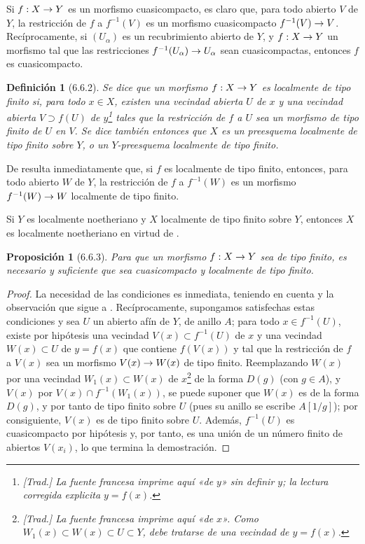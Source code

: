 \documentclass[oneside]{amsart}
\theoremstyle{ega-env-style}
\theoremstyle{ega-thm-env-style}
\newtheorem*{proposition}{Proposición}
\theoremstyle{ega-defn-env-style}
\newtheorem*{definition}{Definición}
\renewcommand{\to}{\mathchoice{\longrightarrow}{\rightarrow}{\rightarrow}{\rightarrow}}
\newcommand{\oldpage}[2][]{{\marginnote{\normalfont{\textbf{#1}~|~#2}}}\ignorespaces}
\let\EGAOriginalLabel\label
\renewcommand{\label}[1]{\phantomsection\EGAOriginalLabel{#1}}
\begin{document}
Si $f:X\to Y$ es un morfismo cuasicompacto, es claro que, para todo abierto $V$ de $Y$, la restricción de $f$ a $f^{-1}(V)$ es un morfismo cuasicompacto $f^{-1}(V)\to V$.
Recíprocamente, si $(U_\alpha)$ es un recubrimiento abierto de $Y$, y $f:X\to Y$ un morfismo tal que las restricciones $f^{-1}(U_\alpha)\to U_\alpha$ sean cuasicompactas, entonces $f$ es cuasicompacto.

\begin{definition}[6.6.2]
\label{I.6.6.2}
{\itshape Se dice que un morfismo $f:X\to Y$ es localmente de tipo finito si, para todo $x\in X$, existen una vecindad abierta $U$ de $x$ y una vecindad abierta $V\supset f(U)$ de $y$\footnote{\emph{[Trad.] La fuente francesa imprime aquí «de $y$» sin definir $y$; la lectura corregida explicita $y=f(x)$.}} tales que la
\oldpage[I]{153}
restricción de $f$ a $U$ sea un morfismo de tipo finito de $U$ en $V$.
Se dice también entonces que $X$ es un preesquema localmente de tipo finito sobre $Y$, o un $Y$-preesquema localmente de tipo finito.}
\end{definition}

De  resulta inmediatamente que, si $f$ es localmente de tipo finito, entonces, para todo abierto $W$ de $Y$, la restricción de $f$ a $f^{-1}(W)$ es un morfismo $f^{-1}(W)\to W$ localmente de tipo finito.

Si $Y$ es localmente noetheriano y $X$ localmente de tipo finito sobre $Y$, entonces $X$ es localmente noetheriano en virtud de .

\begin{proposition}[6.6.3]
\label{I.6.6.3}
Para que un morfismo $f:X\to Y$ sea de tipo finito, es necesario y suficiente que sea cuasicompacto y localmente de tipo finito.
\end{proposition}

\begin{proof}
La necesidad de las condiciones es inmediata, teniendo en cuenta  y la observación que sigue a .
Recíprocamente, supongamos satisfechas estas condiciones y sea $U$ un abierto afín de $Y$, de anillo $A$;
para todo $x\in f^{-1}(U)$, existe por hipótesis una vecindad $V(x)\subset f^{-1}(U)$ de $x$ y una vecindad $W(x)\subset U$ de $y=f(x)$ que contiene $f(V(x))$ y tal que la restricción de $f$ a $V(x)$ sea un morfismo $V(x)\to W(x)$ de tipo finito.
Reemplazando $W(x)$ por una vecindad $W_1(x)\subset W(x)$ de $x$\footnote{\emph{[Trad.] La fuente francesa imprime aquí «de $x$». Como $W_1(x)\subset W(x)\subset U\subset Y$, debe tratarse de una vecindad de $y=f(x)$.}} de la forma $D(g)$ (con $g\in A$), y $V(x)$ por $V(x)\cap f^{-1}(W_1(x))$, se puede suponer que $W(x)$ es de la forma $D(g)$, y por tanto de tipo finito sobre $U$ (pues su anillo se escribe $A[1/g]$);
por consiguiente, $V(x)$ es de tipo finito sobre $U$.
Además, $f^{-1}(U)$ es cuasicompacto por hipótesis y, por tanto, es una unión de un número finito de abiertos $V(x_i)$, lo que termina la demostración.
\end{proof}
\end{document}
